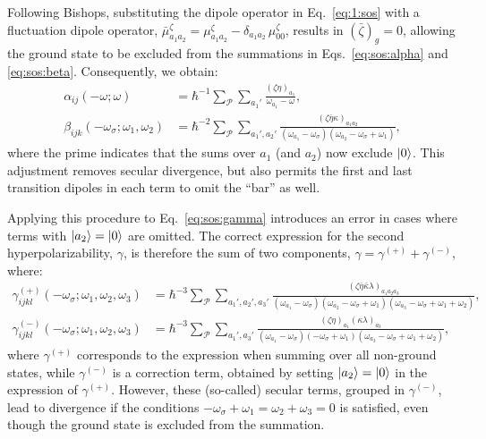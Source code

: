 \documentclass[12pt,a4paper]{article}
\begin{document}
Following Bishops, substituting the dipole operator in Eq.~\eqref{eq:1:sos} with a fluctuation dipole operator, $\bar{\mu}^\zeta_{a_1 a_2} = \mu^\zeta_{a_1 a_2} - \delta_{a_1 a_2}\, \mu_{00}^\zeta$, results in $(\bar{\zeta})_g = 0$, allowing the ground state to be excluded from the summations in Eqs.~\eqref{eq:sos:alpha} and \eqref{eq:sos:beta}. Consequently, we obtain:
\begin{align*}
	\alpha_{ij}(-\omega; \omega) &= \hbar^{-1} \sum_\mathcal{P} \sum_{a_1'} \frac{(\zeta\eta)_{a_1}}{\omega_{a_1} - \omega},\\
	\beta_{ijk}(-\omega_\sigma; \omega_1, \omega_2) &= \hbar^{-2} \sum_\mathcal{P} \sum_{a_1', a_2'} \frac{(\zeta\bar{\eta}\kappa)_{a_1 a_2}}{(\omega_{a_1} - \omega_\sigma)(\omega_{a_2} - \omega_\sigma + \omega_1)},
\end{align*}
where the prime indicates that the sums over $a_1$ (and $a_2$) now exclude $\ket{0}$. This adjustment removes secular divergence, but also permits the first and last transition dipoles in each term to omit the ``bar'' as well.

Applying this procedure to Eq.~\eqref{eq:sos:gamma} introduces an error in cases where terms with $\ket{a_2} = \ket{0}$ are omitted. The correct expression for the second hyperpolarizability, $\gamma$, is therefore the sum of two components, $\gamma = \gamma^{(+)} + \gamma^{(-)}$, where:
\begin{align}
	\gamma_{ijkl}^{(+)}(-\omega_\sigma; \omega_1, \omega_2, \omega_3) &= \hbar^{-3} \sum_\mathcal{P} \sum_{a_1', a_2', a_3'} \frac{(\zeta \bar{\eta} \bar{\kappa} \lambda)_{a_1 a_2 a_3}}{(\omega_{a_1} - \omega_\sigma)(\omega_{a_2} - \omega_\sigma + \omega_1)(\omega_{a_3} - \omega_\sigma + \omega_1 + \omega_2)}, \nonumber\\
	\gamma_{ijkl}^{(-)}(-\omega_\sigma; \omega_1, \omega_2, \omega_3) &= \hbar^{-3} \sum_\mathcal{P} \sum_{a_1', a_3'} \frac{(\zeta \eta)_{a_1} (\kappa \lambda)_{a_3}}{(\omega_{a_1} - \omega_\sigma)(-\omega_\sigma + \omega_1)(\omega_{a_3} - \omega_\sigma + \omega_1 + \omega_2)},
	\label{eq:fluct:gamma}
\end{align}
where $\gamma^{(+)}$ corresponds to the expression when summing over all non-ground states, while $\gamma^{(-)}$ is a correction term, obtained by setting $\ket{a_2} = \ket{0}$ in the expression of $\gamma^{(+)}$. However, these (so-called) secular terms, grouped in $\gamma^{(-)}$, lead to divergence if the conditions $-\omega_\sigma + \omega_1 = \omega_2 + \omega_3 = 0$ is satisfied, even though the ground state is excluded from the summation.
\end{document}
